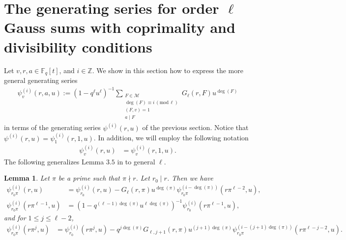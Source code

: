 \documentclass[12pt]{amsart}
\newtheorem{lemma}[theorem]{Lemma}
\newcommand{\Z}{\mathbb{Z}}
\newcommand{\F}{\mathbb{F}}
\renewcommand{\pmod}[1]{\,(\mathrm{mod}\,#1)}
\def\cM{\mathcal{M}}
\begin{document}
\section{The generating series for order $\ell$ Gauss sums with coprimality and divisibility conditions}
\label{sec:remove}
Let $v, r, a \in \F_q[t]$, and $i \in \Z$.
We show in this section how to express the more general generating series
\begin{align*}
 \psi_v^{(i)}(r, a, u)  := (1-q^{\ell} u^{\ell})^{-1}\sum_{\substack{F \in \cM\\ \deg(F) \equiv i \pmod{\ell} \\(F, v)=1\\a \mid F}}  G_\ell(r, F) u^{\deg(F)}
 \end{align*}
 in terms of the generating series $\psi^{(i)}(r, u)$ of the previous section. Notice that $\psi^{(i)}(r, u)  =  \psi_1^{(i)}(r, 1, u)$. In addition, we will employ the following notation
 \begin{align*}
\psi_v^{(i)}(r, u) &=  \psi_v^{(i)}(r, 1, u).
\end{align*}
The following generalizes Lemma $3.5$ in \cite{DFL} to general $\ell$. 
\begin{lemma} \label{relations}
Let $\pi$ be a prime such that $\pi \nmid r$. Let $r_0 \mid r$. Then we have
\begin{align}\label{chantal1}
\psi_{r_0\pi}^{(i)}(r ,u) &=  \psi_{r_0}^{(i)}(r, u) -   G_\ell(r, \pi) u^{\deg(\pi)} \psi_{r_0\pi}^{(i-\deg(\pi))}(r \pi^{\ell-2},u), \\
\psi_{r_0 \pi}^{(i)}(r \pi^{\ell-1},u) &=  \left( 1 - q^{(\ell-1) \deg(\pi)} u^{\ell \deg(\pi)} \right)^{-1} \psi_{r_0}^{(i)}(r \pi^{\ell-1}, u),\label{chantal2}
\end{align}
and for $1 \leq j \leq \ell-2$,
\begin{align}
\psi_{r_0 \pi}^{(i)}(r \pi^j ,u) &= \psi_{r_0}^{(i)}(r \pi^j,u)
 - q^{j \deg(\pi)} G_{\ell, j+1}(r, \pi) u^{(j+1) \deg(\pi)} \psi_{r_0 \pi}^{(i-(j+1)\deg(\pi))}(r \pi^{\ell-j-2},u).\label{chantal3}
 \end{align}
 \end{lemma}
 
\end{document}
